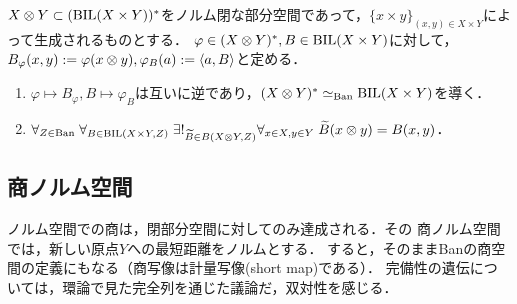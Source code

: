 \documentclass[uplatex,dvipdfmx]{jsreport}
\begin{document}
\begin{definition}
    $X\otimes Y\subset(\mathrm{BIL}(X\times Y))^*$をノルム閉な部分空間であって，$\{x\times y\}_{(x,y)\in X\times Y}$によって生成されるものとする．
    $\varphi\in(X\otimes Y)^*,B\in\mathrm{BIL}(X\times Y)$に対して，$B_\varphi(x,y):=\varphi(x\otimes y),\varphi_B(a):=\langle a,B\rangle$と定める．
\end{definition}

\begin{proposition}[射影的テンソル積の普遍性]\mbox{}
    \begin{enumerate}
        \item $\varphi\mapsto B_\varphi,B\mapsto\varphi_B$は互いに逆であり，$(X\otimes Y)^*\simeq_{\mathrm{Ban}}\mathrm{BIL}(X\times Y)$を導く．
        \item $\forall_{Z\in\mathrm{Ban}}\;\forall_{B\in\mathrm{BIL}(X\times Y,Z)}\;\exists!_{\widetilde{B}\in B(X\otimes Y,Z)}\forall_{x\in X,y\in Y}\;\widetilde{B}(x\otimes y)=B(x,y)$．
    \end{enumerate}
\end{proposition}

\subsection{商ノルム空間}

\begin{tcolorbox}[colframe=ForestGreen, colback=ForestGreen!10!white,breakable,colbacktitle=ForestGreen!40!white,coltitle=black,fonttitle=\bfseries\sffamily,
title=]
    ノルム空間での商は，閉部分空間に対してのみ達成される．その
    商ノルム空間では，新しい原点$Y$への最短距離をノルムとする．
    すると，そのままBanの商空間の定義にもなる（商写像は計量写像(short map)である）．
    完備性の遺伝については，環論で見た完全列を通じた議論だ，双対性を感じる．
\end{tcolorbox}
\end{document}

